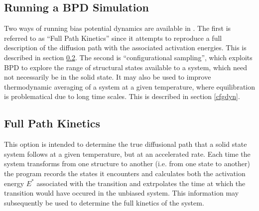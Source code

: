 \subsection{Running a BPD Simulation}

Two ways of running bias potential dynamics are available in \D{}. The
first is referred to as ``Full Path Kinetics'' since it attempts to
reproduce a full description of the diffusion path with the associated
activation energies. This is described in section \ref{FPK}. The
second is ``configurational sampling'', which exploits BPD to explore
the range of structural states available to a system, which need not
necessarily be in the solid state. It may also be used to improve
thermodynamic averaging of a system at a given temperature, where
equilibration is problematical due to long time scales. This is
described in section \ref{cfgdyn}.

\subsection{Full Path Kinetics}
\label{FPK}
This option is intended to determine the true diffusional path that a
solid state system follows at a given temperature, but at an
accelerated rate.  Each time the system transforms from one structure
to another (i.e. from one state to another) the program records the
states it encounters and calculates both the activation energy $E^{*}$
associated with the transition and extrpolates the time at which the
transition would have occured in the unbiased system.  This information may
subsequently be used to determine the full kinetics of the system.

